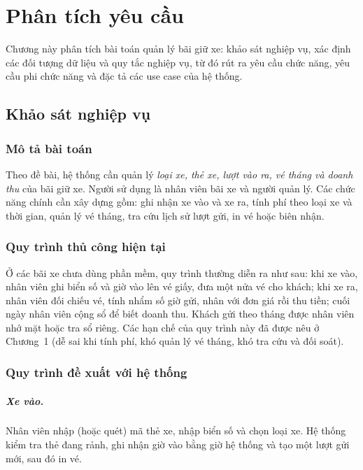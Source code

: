 \chapter{Phân tích yêu cầu}
\captionsetup[table]{position=below,skip=6pt}

Chương này phân tích bài toán quản lý bãi giữ xe: khảo sát nghiệp vụ, xác định các đối tượng dữ liệu và quy tắc nghiệp vụ, từ đó rút ra yêu cầu chức năng, yêu cầu phi chức năng và đặc tả các use case của hệ thống.

\section{Khảo sát nghiệp vụ}

\subsection{Mô tả bài toán}

Theo đề bài, hệ thống cần quản lý \textit{loại xe, thẻ xe, lượt vào ra, vé tháng và doanh thu} của bãi giữ xe. Người sử dụng là nhân viên bãi xe và người quản lý. Các chức năng chính cần xây dựng gồm: ghi nhận xe vào và xe ra, tính phí theo loại xe và thời gian, quản lý vé tháng, tra cứu lịch sử lượt gửi, in vé hoặc biên nhận.

\subsection{Quy trình thủ công hiện tại}

Ở các bãi xe chưa dùng phần mềm, quy trình thường diễn ra như sau: khi xe vào, nhân viên ghi biển số và giờ vào lên vé giấy, đưa một nửa vé cho khách; khi xe ra, nhân viên đối chiếu vé, tính nhẩm số giờ gửi, nhân với đơn giá rồi thu tiền; cuối ngày nhân viên cộng sổ để biết doanh thu. Khách gửi theo tháng được nhân viên nhớ mặt hoặc tra sổ riêng. Các hạn chế của quy trình này đã được nêu ở Chương~1 (dễ sai khi tính phí, khó quản lý vé tháng, khó tra cứu và đối soát).

\subsection{Quy trình đề xuất với hệ thống}

\paragraph{Xe vào.} Nhân viên nhập (hoặc quét) mã thẻ xe, nhập biển số và chọn loại xe. Hệ thống kiểm tra thẻ đang rảnh, ghi nhận giờ vào bằng giờ hệ thống và tạo một lượt gửi mới, sau đó in vé.

